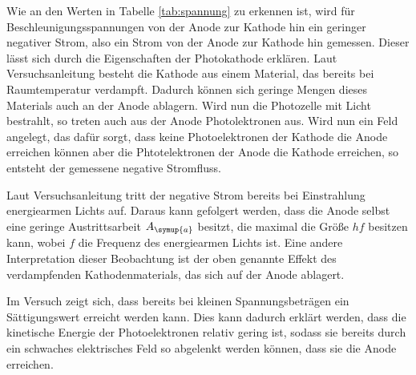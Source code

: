 Wie an den Werten in Tabelle \ref{tab:spannung} zu erkennen ist, wird für Beschleunigungsspannungen
von der Anode zur Kathode hin ein geringer negativer Strom, also ein Strom von
der Anode zur Kathode hin gemessen. Dieser lässt sich durch die Eigenschaften der
Photokathode erklären. Laut Versuchsanleitung \cite{Versuchsanleitung} besteht die
Kathode aus einem Material, das bereits bei Raumtemperatur verdampft. Dadurch können
sich geringe Mengen dieses Materials auch an der Anode ablagern. Wird nun die
Photozelle mit Licht bestrahlt, so treten auch aus der Anode Photolektronen aus.
Wird nun ein Feld angelegt, das dafür sorgt, dass keine Photoelektronen der Kathode
die Anode erreichen können aber die Phtotelektronen der Anode die Kathode erreichen,
so entsteht der gemessene negative Stromfluss.

Laut Versuchsanleitung \cite{Versuchsanleitung} tritt der negative Strom bereits
bei Einstrahlung energiearmen Lichts auf. Daraus kann gefolgert werden, dass die
Anode selbst eine geringe Austrittsarbeit $A_{\symup{a}}$ besitzt, die maximal die
Größe $hf$ besitzen kann, wobei $f$ die Frequenz des energiearmen Lichts ist.
Eine andere Interpretation dieser Beobachtung ist der oben genannte Effekt des
verdampfenden Kathodenmaterials, das sich auf der Anode ablagert.

Im Versuch zeigt sich, dass bereits bei kleinen Spannungsbeträgen ein Sättigungswert
erreicht werden kann. Dies kann dadurch erklärt werden, dass die kinetische Energie
der Photoelektronen relativ gering ist, sodass sie bereits durch ein schwaches
elektrisches Feld so abgelenkt werden können, dass sie die Anode erreichen.
